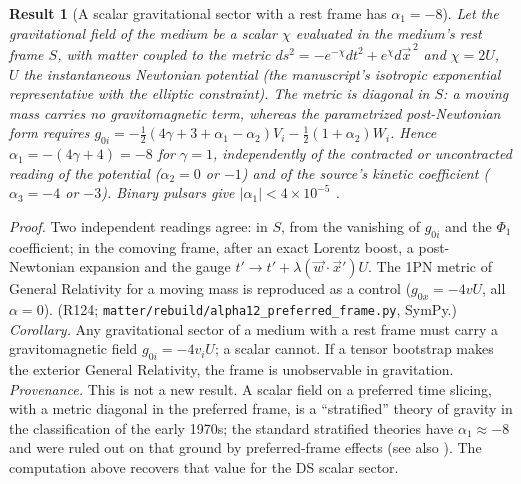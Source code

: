 \documentclass[11pt,a4paper]{article}
\newtheorem{prop}{Result}
\begin{document}
\begin{prop}[A scalar gravitational sector with a rest frame has $\alpha_1 = -8$]
Let the gravitational field of the medium be a scalar $\chi$ evaluated in the medium's rest frame $S$, with matter coupled to the metric $ds^2 = -e^{-\chi}dt^2 + e^{\chi}d\vec x^{\,2}$ and $\chi = 2U$, $U$ the instantaneous Newtonian potential (the manuscript's isotropic exponential representative with the elliptic constraint). The metric is diagonal in $S$: a moving mass carries no gravitomagnetic term, whereas the parametrized post-Newtonian form requires $g_{0i} = -\tfrac12(4\gamma+3+\alpha_1-\alpha_2)V_i - \tfrac12(1+\alpha_2)W_i$. Hence $\alpha_1 = -(4\gamma+4) = -8$ for $\gamma = 1$, independently of the contracted or uncontracted reading of the potential ($\alpha_2 = 0$ or $-1$) and of the source's kinetic coefficient ($\alpha_3 = -4$ or $-3$). Binary pulsars give $|\alpha_1| < 4\times10^{-5}$ \cite{shao2012}.
\end{prop}
\noindent\emph{Proof.} Two independent readings agree: in $S$, from the vanishing of $g_{0i}$ and the $\Phi_1$ coefficient; in the comoving frame, after an exact Lorentz boost, a post-Newtonian expansion and the gauge $t' \to t' + \lambda(\vec w\cdot\vec x')U$. The 1PN metric of General Relativity for a moving mass is reproduced as a control ($g_{0x} = -4vU$, all $\alpha = 0$). (R124; \texttt{matter/rebuild/alpha12\_preferred\_frame.py}, SymPy.) \emph{Corollary.} Any gravitational sector of a medium with a rest frame must carry a gravitomagnetic field $g_{0i} = -4v_iU$; a scalar cannot. If a tensor bootstrap makes the exterior General Relativity, the frame is unobservable in gravitation. \emph{Provenance.} This is not a new result. A scalar field on a preferred time slicing, with a metric diagonal in the preferred frame, is a ``stratified'' theory of gravity in the classification of the early 1970s; the standard stratified theories have $\alpha_1 \approx -8$ and were ruled out on that ground by preferred-frame effects \cite{ni1972,nordtvedtwill1972} (see also \cite{sanders1997}). The computation above recovers that value for the DS scalar sector.
\end{document}
